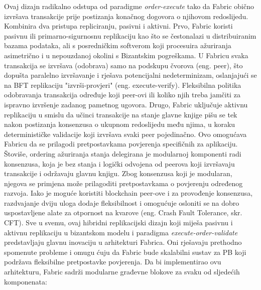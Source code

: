 \documentclass[times, utf8, diplomski]{fer}
\begin{document}
Ovaj dizajn radikalno odstupa od paradigme \textit{order-execute} tako da Fabric obično izvršava transakcije prije postizanja konačnog dogovora o njihovom redoslijedu. Kombinira dva pristupa repliciranju, pasivni i aktivni.
Prvo, Fabric koristi pasivnu ili primarno-sigurnosnu replikaciju kao što se čestonalazi u distribuiranim bazama podataka, ali s posredničkim softverom koji procesuira ažuriranja asimetrično i u nepouzdanoj okolini s Bizantskim pogreškama. U Fabricu svaka transakcija se izvršava (odobrava) samo na podskupu čvorova (eng. peer), što dopušta paralelno izvršavanje i rješava potencijalni nedeterminizam, oslanjajući se na BFT replikaciju "izvrši-provjeri" (eng. execute-verify). Fleksibilna politika odobravanja transakcija određuje koji peer-ovi ili koliko njih treba jamčiti za ispravno izvršenje zadanog pametnog ugovora.
Drugo, Fabric uključuje aktivnu replikaciju u smislu da učinci transakcije na stanje glavne knjige pišu se tek nakon postizanja konsenzusa o ukupnom redoslijedu među njima, u koraku determinističke validacije koji izvršava svaki peer pojedinačno. Ovo omogućava Fabricu da se prilagodi pretpostavkama povjerenja specifičnih za aplikaciju.
Štoviše, ordering ažuriranja stanja delegirana je modularnoj komponenti radi konsenzusa, koja je bez stanja i logički odvojena od peerova koji izvršavaju transakcije i održavaju glavnu knjigu. Zbog konsenzusa koji je modularan, njegova se primjena može prilagoditi pretpostavkama o povjerenju određenog razvoja. Iako je moguće koristiti blockchain peer-ove i za provođenje konsenzusa, razdvajanje dviju uloga dodaje fleksibilnost i omogućuje osloniti se na dobro uspostavljene alate za otpornost na kvarove
(eng. Crash Fault Tolerance, skr. CFT).
Sve u svemu, ovaj hibridni replikacijski dizajn koji miješa pasivnu i aktivnu replikaciju u bizantskom modelu i paradigma \textit{ execute-order-validate} predstavljaju glavnu inovaciju u arhitekturi Fabrica. Oni rješavaju prethodno spomenute probleme i omugu ćuju da Fabric bude skalabilni sustav za PB koji podržava fleksibilne pretpostavke povjerenja. Da bi implementirao ovu arhitekturu, Fabric sadrži modularne građevne blokove za svaku od sljedećih komponenata:
\end{document}
